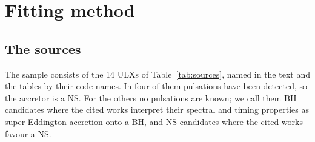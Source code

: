 

\section{Fitting method}
\label{sec:fitting}

\subsection{The sources}
\label{sec:fitting:sources}

The sample consists of the 14 ULXs of Table~\ref{tab:sources}, named in the text and the tables by their code names.
In four of them pulsations have been detected, so the accretor is a NS.
For the others no pulsations are known; we call them BH candidates where the cited works interpret their spectral and timing properties as super-Eddington accretion onto a BH, and NS candidates where the cited works favour a NS.

